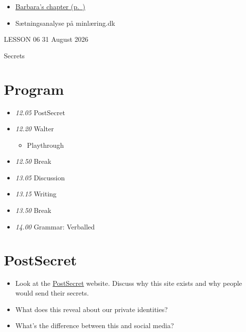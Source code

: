 \documentclass[11pt,a4paper,oneside]{book}
\begin{document}
\begin{itemize}
\item \hyperref[worksheet-7]{Barbara's chapter (p.~\pageref*{worksheet-7})}
\item Sætningsanalyse på minlæring.dk
\end{itemize}

\clearpage{}
{\color{blue}\small LESSON 06 \hfill 31 August 2026\par}
\vspace{4mm}
{\displayfont\color{navy}\fontsize{30}{34}\selectfont Secrets\par}\vspace{4mm}

\section*{Program}

\begin{itemize}
\item \emph{12.05} PostSecret
\item \emph{12.20} Walter

\begin{itemize}
\item Playthrough
\end{itemize}

\item \emph{12.50} Break
\item \emph{13.05} Discussion
\item \emph{13.15} Writing
\item \emph{13.50} Break
\item \emph{14.00} Grammar: Verballed
\end{itemize}

\section*{PostSecret}

\begin{itemize}
\item Look at the \href{https://postsecret.com}{PostSecret} website. Discuss why this site exists and why people would send their secrets.
\item What does this reveal about our private identities?
\item What's the difference between this and social media?
\end{itemize}
\end{document}

